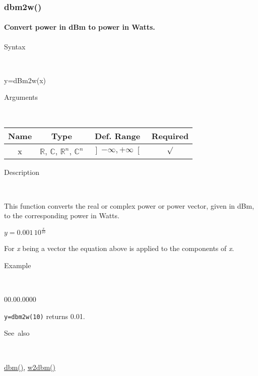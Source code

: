 \newpage
\subsubsection*{\hypertarget{dbm2w}{}{\Large dbm2w()}}


\paragraph{\label{par:dbm2w}Convert power in dBm to power in Watts.}

\begin{description}
\item [Syntax]~
\end{description}
y=dBm2w(x)

\begin{description}
\item [Arguments]~
\end{description}
\begin{tabular}{|c|c|c|c|}
\hline 
Name&
Type&
Def. Range&
Required\tabularnewline
\hline
\hline 
x&
$\mathbb{R}$, $\mathbb{C}$, $\mathbb{R}^{n}$, $\mathbb{C}^{n}$&
$\left]-\infty,+\infty\right[$&
$\surd$\tabularnewline
\hline
\end{tabular}

\begin{description}
\item [Description]~
\end{description}
This function converts the real or complex power or power vector,
given in dBm, to the corresponding power in Watts.

\medskip{}
$y=0.001\,{\displaystyle 10^{\frac{x}{10}}}$
\medskip{}

\noindent For \textit{x} being a vector the equation above is applied
to the components of \textit{x}.

\begin{description}
\item [Example]~
\end{description}
\begin{lyxlist}{00.00.0000}
\item [\texttt{y=dbm2w(10)}]returns 0.01.
\end{lyxlist}
\begin{description}
\item [See~also]~
\end{description}
\textcolor{blue}{\hyperlink{dbm}{dbm()}}\textcolor{black}{,} \textcolor{blue}{\hyperlink{w2dbm}{w2dbm()}}


